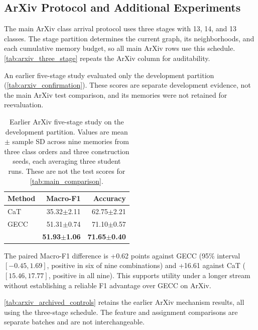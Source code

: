 \subsection{ArXiv Protocol and Additional Experiments}
\label{app:arxiv_archive}

The main ArXiv class arrival protocol uses three stages with 13, 14, and
13 classes. The stage partition determines the current graph, its
neighborhoods, and each cumulative memory budget, so all main ArXiv rows use
this schedule. \autoref{tab:arxiv_three_stage} repeats the ArXiv column for
auditability.



An earlier five-stage study evaluated only the development partition
(\autoref{tab:arxiv_confirmation}). These scores are separate development
evidence, not the main ArXiv test comparison, and its memories were not
retained for reevaluation.

\begin{table}[H]
\centering
\footnotesize
\setlength{\tabcolsep}{3pt}
\caption{Earlier ArXiv five-stage study on the development partition.
Values are mean $\pm$ sample SD across nine memories from three class
orders and three construction seeds, each averaging three student runs.
These are not the test scores for \autoref{tab:main_comparison}.}
\label{tab:arxiv_confirmation}
\begin{tabular*}{\linewidth}{@{\extracolsep{\fill}}lrr@{}}
\toprule
Method & Macro-F1 & Accuracy\\
\midrule
CaT & 35.32$\pm$2.11 & 62.75$\pm$2.21\\
GECC & 51.31$\pm$0.74 & 71.10$\pm$0.57\\
\method{} & \textbf{51.93$\pm$1.06} & \textbf{71.65$\pm$0.40}\\
\bottomrule
\end{tabular*}
\end{table}

The paired Macro-F1 difference is +0.62 points against GECC
(95\% interval $[-0.45,1.69]$, positive in six of nine combinations)
and +16.61 against CaT ($[15.46,17.77]$, positive in all nine).
This supports utility under a longer stream without establishing a
reliable F1 advantage over GECC on ArXiv.

\autoref{tab:arxiv_archived_controls} retains the earlier ArXiv mechanism
results, all using the three-stage schedule. The feature and assignment
comparisons are separate batches and are not interchangeable.

